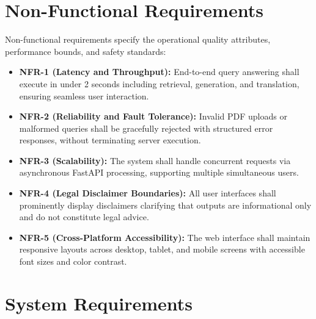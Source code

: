 \documentclass[12pt,a4paper]{report}
\begin{document}
\section{Non-Functional Requirements}
Non-functional requirements specify the operational quality attributes, performance bounds, and safety standards:
\begin{itemize}
    \item \textbf{NFR-1 (Latency and Throughput):} End-to-end query answering shall execute in under 2 seconds including retrieval, generation, and translation, ensuring seamless user interaction.
    \item \textbf{NFR-2 (Reliability and Fault Tolerance):} Invalid PDF uploads or malformed queries shall be gracefully rejected with structured error responses, without terminating server execution.
    \item \textbf{NFR-3 (Scalability):} The system shall handle concurrent requests via asynchronous FastAPI processing, supporting multiple simultaneous users.
    \item \textbf{NFR-4 (Legal Disclaimer Boundaries):} All user interfaces shall prominently display disclaimers clarifying that outputs are informational only and do not constitute legal advice.
    \item \textbf{NFR-5 (Cross-Platform Accessibility):} The web interface shall maintain responsive layouts across desktop, tablet, and mobile screens with accessible font sizes and color contrast.
\end{itemize}

\section{System Requirements}
\end{document}
